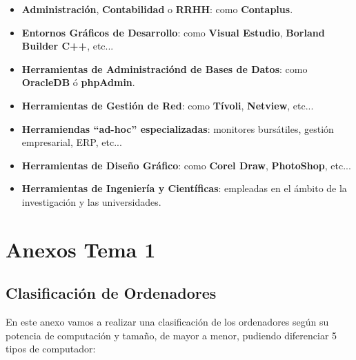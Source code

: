 \begin{itemize}
    \begin{itemize}
        \item \textbf{Administración}, \textbf{Contabilidad} o \textbf{RRHH}: como \textbf{Contaplus}.
        \item \textbf{Entornos Gráficos de Desarrollo}: como \textbf{Visual Estudio}, \textbf{Borland Builder C++}, etc...
        \item \textbf{Herramientas de Administraciónd de Bases de Datos}: como \textbf{OracleDB} ó \textbf{phpAdmin}.
        \item \textbf{Herramientas de Gestión de Red}: como \textbf{Tívoli}, \textbf{Netview}, etc...
        \item \textbf{Herramiendas ``ad-hoc'' especializadas}: monitores bursátiles, gestión empresarial, ERP, etc...
        \item \textbf{Herramientas de Diseño Gráfico}: como \textbf{Corel Draw}, \textbf{PhotoShop}, etc...
        \item \textbf{Herramientas de Ingeniería y Científicas}: empleadas en el ámbito de la investigación y las universidades.
    \end{itemize}
\end{itemize}

\appendix


\chapter{Anexos Tema 1}

\section{Clasificación de Ordenadores}
En este anexo vamos a realizar una clasificación de los ordenadores según su potencia de computación y tamaño, de mayor a menor, pudiendo diferenciar 5 tipos de computador:

